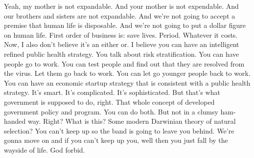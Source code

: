 Yeah, my mother is not expandable. And your mother is not expendable. And our
brothers and sisters are not expandable. And we're not going to accept a premise
that human life is disposable. And we're not going to put a dollar figure on
human life. First order of business is: save lives. Period. Whatever it costs.
Now, I also don't believe it's an either or. I believe you can have an
intelligent refined public health strategy. You talk about risk stratification.
You can have people go to work. You can test people and find out that they are
resolved from the virus. Let them go back to work. You can let go younger people
back to work. You can have an economic startup strategy that is consistent with a
public health strategy. It's smart. It's complicated. It's sophisticated. But
that's what government is supposed to do, right. That whole concept of developed
government policy and program. You can do both. But not in a clumsy ham-handed
way. Right?  What is this? Some modern Darwinian theory
of natural selection? You can't keep up so the band is going to leave you behind.
We're gonna move on and if you can't keep up you, well then you just fall by the
wayside of life. God forbid.
